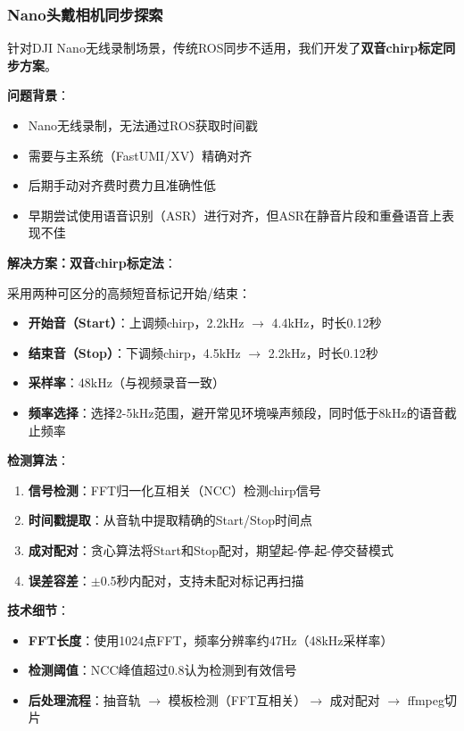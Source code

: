 \subsubsection{Nano头戴相机同步探索}

针对DJI Nano无线录制场景，传统ROS同步不适用，我们开发了\textbf{双音chirp标定同步方案}。

\textbf{问题背景}：
\begin{itemize}[leftmargin=2em]
    \item Nano无线录制，无法通过ROS获取时间戳
    \item 需要与主系统（FastUMI/XV）精确对齐
    \item 后期手动对齐费时费力且准确性低
    \item 早期尝试使用语音识别（ASR）进行对齐，但ASR在静音片段和重叠语音上表现不佳
\end{itemize}

\textbf{解决方案：双音chirp标定法}：

采用两种可区分的高频短音标记开始/结束\cite{oppenheim1999discrete,rabiner1975chirp}：
\begin{itemize}[leftmargin=2em]
    \item \textbf{开始音（Start）}：上调频chirp，2.2kHz $\rightarrow$ 4.4kHz，时长0.12秒
    \item \textbf{结束音（Stop）}：下调频chirp，4.5kHz $\rightarrow$ 2.2kHz，时长0.12秒
    \item \textbf{采样率}：48kHz（与视频录音一致）
    \item \textbf{频率选择}：选择2-5kHz范围，避开常见环境噪声频段，同时低于8kHz的语音截止频率
\end{itemize}

\textbf{检测算法}：
\begin{enumerate}[leftmargin=2em]
    \item \textbf{信号检测}：FFT归一化互相关（NCC）检测chirp信号
    \item \textbf{时间戳提取}：从音轨中提取精确的Start/Stop时间点
    \item \textbf{成对配对}：贪心算法将Start和Stop配对，期望起-停-起-停交替模式
    \item \textbf{误差容差}：$\pm$0.5秒内配对，支持未配对标记再扫描
\end{enumerate}

\textbf{技术细节}：
\begin{itemize}[leftmargin=2em]
    \item \textbf{FFT长度}：使用1024点FFT，频率分辨率约47Hz（48kHz采样率）
    \item \textbf{检测阈值}：NCC峰值超过0.8认为检测到有效信号
    \item \textbf{后处理流程}：抽音轨 $\rightarrow$ 模板检测（FFT互相关）$\rightarrow$ 成对配对 $\rightarrow$ ffmpeg切片
\end{itemize}

